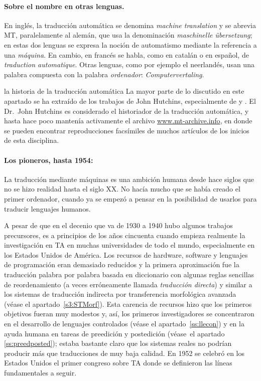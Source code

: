 \paragraph{Sobre el nombre en otras lenguas.} En inglés, la traducción automática se denomina \emph{machine translation} y se abrevia MT, paralelamente al alemán, que usa la denominación \emph{maschinelle übersetzung}; en estas dos lenguas se expresa la noción de automatismo mediante la referencia a una {\em máquina}. En cambio, en francés se habla, como en catalán o en español, de {\em traduction automatique}. Otras lenguas, como por ejemplo el neerlandés, usan una palabra compuesta con la palabra \emph{ordenador}: \emph{Computervertaling}. 

\begin{persabermes}{la historia de la traducción automática} La mayor parte de lo discutido en este apartado se ha extraído de los trabajos de John Hutchins, especialmente de \cite{hutchins1995} y \cite{hutchins2001}. El Dr.\ John Hutchins es considerado el historiador de la traducción automática, y hasta hace poco mantenía activamente el archivo \url{www.mt-archive.info}, en donde se pueden encontrar reproducciones facsímiles de muchos artículos de los inicios de esta disciplina. 

\paragraph{Los pioneros, hasta 1954:} La traducción mediante máquinas es una ambición humana desde hace siglos que no se hizo realidad hasta el siglo XX. No hacía mucho que se había creado el primer ordenador, cuando ya se empezó a pensar en la posibilidad de usarlos para traducir lenguajes humanos. 

A pesar de que en el decenio que va de 1930 a 1940 hubo algunos trabajos precursores, es a principios de los años cincuenta cuando empieza realmente la investigación en TA en muchas universidades de todo el mundo, especialmente en los Estados Unidos de América. Los recursos de hardware, software y lenguajes de programación eran demasiado reducidos y la primera aproximación fue la traducción palabra por palabra basada en diccionario con algunas reglas sencillas de reordenamiento (a veces erróneamente llamada \emph{traducción directa}) y similar a los sistemas de traducción indirecta por transferencia morfológica avanzada (véase el apartado~\ref{s3:STMorf}). Esta carencia de recursos hizo que los primeros objetivos fueran muy modestos y, así, los primeros investigadores se concentraron en el desarrollo de lenguajes controlados (véase el apartado~\ref{ss:llecon}) y en la ayuda humana en tareas de preedición y postedición (véase~el apartado \ref{ss:preedposted}); estaba bastante claro que los sistemas reales no podrían producir más que traducciones de muy baja calidad. En 1952 se celebró en los Estados Unidos el primer congreso sobre TA donde se definieron las líneas fundamentales a seguir. 


\end{persabermes}
